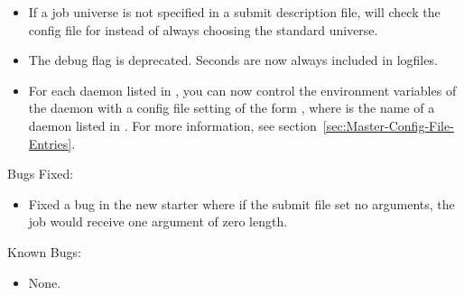 \begin{itemize}

\item If a job universe is not specified in a submit description file, 
  will check the config file for 
instead of always choosing the standard universe. 

\item The  debug flag is deprecated. Seconds are now always
included in logfiles. 

\item For each daemon listed in , you can now control the
environment variables of the daemon with a config file setting of the form
, where  is the name of a
daemon listed in . For more information, see
section~\ref{sec:Master-Config-File-Entries}.

\end{itemize}

\noindent Bugs Fixed:

\begin{itemize}

\item Fixed a bug in the new starter where if the submit file set no
arguments, the job would receive one argument of zero length.

\end{itemize}

\noindent Known Bugs:

\begin{itemize}

\item None.

\end{itemize}
